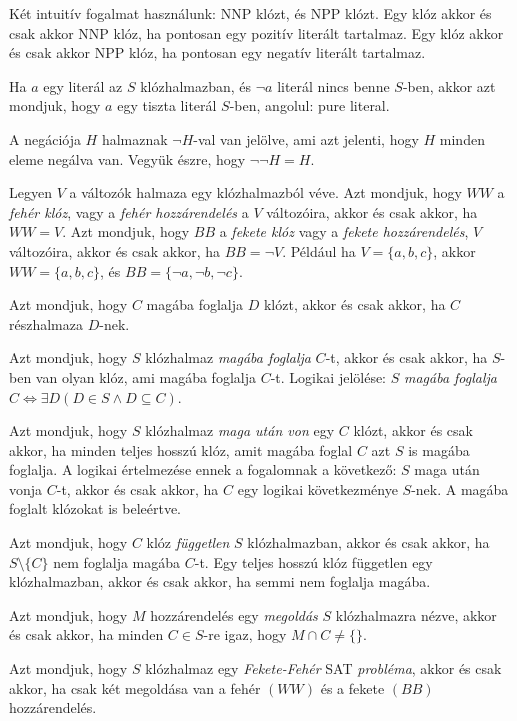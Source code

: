 \documentclass[
]{thesis-ekf}
\theoremstyle{definition}
\theoremstyle{remark}
\begin{document}
	Két intuitív fogalmat használunk: \textsc{NNP} klózt, és \textsc{NPP} klózt. Egy klóz akkor és csak akkor \textsc{NNP} klóz, ha pontosan egy pozitív literált tartalmaz. Egy klóz akkor és csak akkor \textsc{NPP} klóz, ha pontosan egy negatív literált tartalmaz.
	
	Ha $ a $ egy literál az $ S $ klózhalmazban, és $ \neg a $ literál nincs benne $ S $-ben, akkor azt mondjuk, hogy $ a $ egy tiszta literál $ S $-ben, angolul: pure literal.
	
	A negációja $ H $ halmaznak $ \neg H $-val van jelölve, ami azt jelenti, hogy $ H $ minden eleme negálva van. Vegyük észre, hogy $ \neg\neg H=H $.

	Legyen $ V $ a változók halmaza egy klózhalmazból véve. Azt mondjuk, hogy $ WW $ a \emph{fehér klóz}, vagy a \emph{fehér hozzárendelés} a $ V $ változóira, akkor és csak akkor, ha $ WW=V $. Azt mondjuk, hogy $ BB $ a \emph{fekete klóz} vagy a \emph{fekete hozzárendelés}, $ V $ változóira, akkor és csak akkor, ha $ BB =\neg V$. Például ha $ V=\{a,b,c\} $, akkor $ WW=\{a,b,c\} $, és $ BB=\{\neg a,\neg b,\neg c\} $.
	
	Azt mondjuk, hogy $ C $ magába foglalja $ D $ klózt, akkor és csak akkor, ha $ C $ részhalmaza $ D $-nek.
	
	Azt mondjuk, hogy $ S $ klózhalmaz \emph{magába foglalja} $ C $-t, akkor és csak akkor, ha $ S $-ben van olyan klóz, ami magába foglalja $ C $-t. Logikai jelölése: $ S $ \emph{magába foglalja} $ C \Leftrightarrow\exists D(D\in S\wedge D\subseteq C) $.
	
	Azt mondjuk, hogy $ S $ klózhalmaz \emph{maga után von} egy $ C $ klózt, akkor és csak akkor, ha minden teljes hosszú klóz, amit magába foglal $ C $ azt $ S $ is magába foglalja. A logikai értelmezése ennek a fogalomnak a következő: $ S $ maga után vonja $ C $-t, akkor és csak akkor, ha $ C $ egy logikai következménye $ S $-nek. A magába foglalt klózokat is beleértve.

	Azt mondjuk, hogy $ C $ klóz \emph{független} $ S $ klózhalmazban, akkor és csak akkor, ha $ S\setminus\{C\} $ nem foglalja magába $ C $-t. Egy teljes hosszú klóz független egy klózhalmazban, akkor és csak akkor, ha semmi nem foglalja magába.

	Azt mondjuk, hogy $ M $ hozzárendelés egy \emph{megoldás} $ S $ klózhalmazra nézve, akkor és csak akkor, ha minden $ C\in S $-re igaz, hogy $ M\cap C\ne \{\} $.

	Azt mondjuk, hogy $ S $ klózhalmaz egy \emph{Fekete-Fehér} \textsc{SAT} \emph{probléma}, akkor és csak akkor, ha csak két megoldása van a fehér $ (WW) $ és a fekete $ (BB) $ hozzárendelés.
\end{document}
